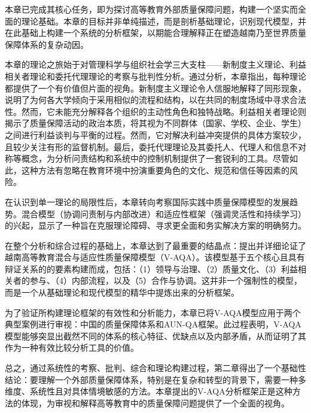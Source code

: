 本章已完成其核心任务，即为探讨高等教育外部质量保障问题，构建一个坚实而全面的理论基础。本章的目标并非单纯描述，而是剖析基础理论，识别现代模型，并在此基础上构建一个系统的分析框架，以期能合理解释正在塑造越南乃至世界质量保障体系的复杂动因。

本章的理论之旅始于对管理科学与组织社会学三大支柱——新制度主义理论、利益相关者理论和委托代理理论的考察与批判性分析。通过分析，本章指出，每种理论都提供了一个有价值但片面的视角。新制度主义理论令人信服地解释了同形现象，说明了为何各大学倾向于采用相似的流程和结构，以在共同的制度场域中寻求合法性。然而，它未能充分解释各个组织的主动性角色和独特战略。利益相关者理论则揭示了质量保障活动的政治本质，将其视为不同群体（国家、学校、企业、学生）之间进行利益谈判与平衡的过程。然而，它对解决利益冲突提供的具体方案较少，且较少关注有形的监督机制。最后，委托代理理论及其委托人、代理人和信息不对称等概念，为分析问责结构和系统中的控制机制提供了一套锐利的工具。尽管如此，这种方法有忽略在教育环境中扮演重要角色的文化、规范和信任等因素的风险。

在认识到单一理论的局限性后，本章转向考察国际实践中质量保障模型的发展趋势。混合模型（协调问责制与内部改进）和适应性框架（强调灵活性和持续学习）的兴起，显示了一种旨在克服理论障碍、寻求更全面和务实解决方案的明确努力。

在整个分析和综合过程的基础上，本章达到了最重要的结晶点：提出并详细论证了越南高等教育混合与适应性质量保障模型（V-AQA）。该模型基于五个核心且具有辩证关系的的要素构建而成，包括：（1）领导与治理、（2）质量文化、（3）利益相关者的参与、（4）内部流程，以及（5）合作与协调。这并非一个强制性的模型，而是一个从基础理论和现代模型的精华中提炼出来的分析框架。

为了验证所构建理论框架的有效性和分析能力，本章已将V-AQA模型应用于两个典型案例进行审视：中国的质量保障体系和AUN-QA框架。此过程表明，V-AQA模型能够突显出截然不同的体系的核心特征、优缺点以及内部矛盾，从而证明了其作为一种有效比较分析工具的价值。

总之，通过系统性的考察、批判、综合和理论构建过程，第二章得出了一个基础性结论：要理解一个外部质量保障体系，特别是在复杂和转型的背景下，需要一种多维度、系统性且对具体情境敏感的方法。本章提出的V-AQA分析框架正是这种方法的体现，为审视和解释高等教育中的质量保障问题提供了一个全面的视角。














